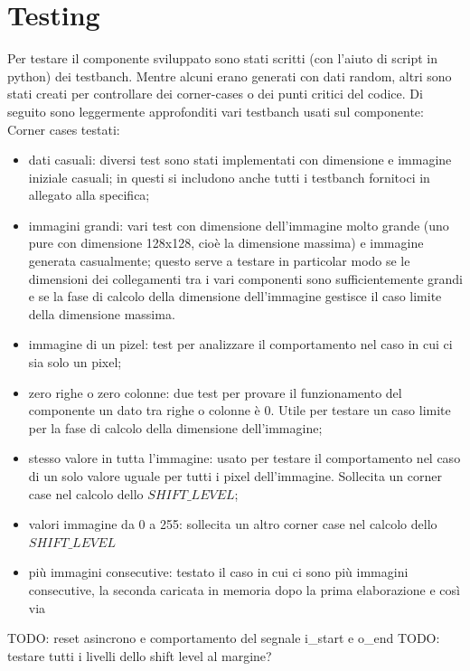 \documentclass[11pt]{article} %
\begin{document}
\section{Testing}
Per testare il componente sviluppato sono stati scritti (con l'aiuto di script in python) dei testbanch. Mentre alcuni erano generati con dati random, altri sono stati creati per controllare dei corner-cases o dei punti critici del codice. Di seguito sono leggermente approfonditi vari testbanch usati sul componente:
Corner cases testati:
\begin{itemize}
\item dati casuali: diversi test sono stati implementati con dimensione e immagine iniziale casuali; in questi si includono anche tutti i testbanch fornitoci in allegato alla specifica;
\item immagini grandi: vari test con dimensione dell'immagine molto grande (uno pure con dimensione 128x128, cioè la dimensione massima) e immagine generata casualmente; questo serve a testare in particolar modo se le dimensioni dei collegamenti tra i vari componenti sono sufficientemente grandi e se la fase di calcolo della dimensione dell'immagine gestisce il caso limite della dimensione massima.
\item immagine di un pizel: test per analizzare il comportamento nel caso in cui ci sia solo un pixel;
\item zero righe o zero colonne: due test per provare il funzionamento del componente un dato tra righe o colonne è 0. Utile per testare un caso limite per la fase di calcolo della dimensione dell'immagine;
\item stesso valore in tutta l'immagine: usato per testare il comportamento nel caso di un solo valore uguale per tutti i pixel dell'immagine. Sollecita un corner case nel calcolo dello $SHIFT\_LEVEL$;
\item valori immagine da 0 a 255: sollecita un altro corner case nel calcolo dello $SHIFT\_LEVEL$
\item più immagini consecutive: testato il caso in cui ci sono più immagini consecutive, la seconda caricata in memoria dopo la prima elaborazione e così via
\end{itemize}

TODO: reset asincrono e comportamento del segnale i\_start e o\_end
TODO: testare tutti i livelli dello shift level al margine?
\end{document}
